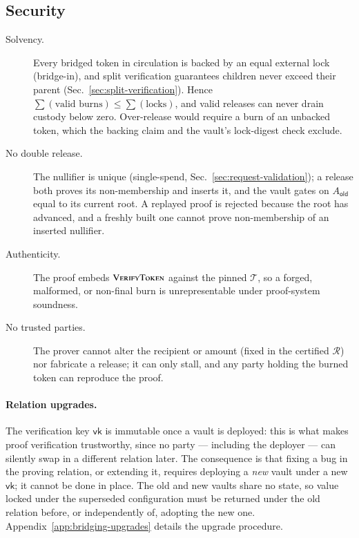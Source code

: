 \subsection{Security}\label{sec:bridge-security}

\begin{description}
\item[Solvency.] Every bridged token in circulation is backed by an equal external lock (bridge-in), and split verification guarantees children never exceed their parent (Sec.~\ref{sec:split-verification}). Hence $\sum(\text{valid burns}) \le \sum(\text{locks})$, and valid releases can never drain custody below zero. Over-release would require a burn of an unbacked token, which the backing claim and the vault's lock-digest check exclude.
\item[No double release.] The nullifier is unique (single-spend, Sec.~\ref{sec:request-validation}); a release both proves its non-membership and inserts it, and the vault gates on $A_\mathsf{old}$ equal to its current root. A replayed proof is rejected because the root has advanced, and a freshly built one cannot prove non-membership of an inserted nullifier.
\item[Authenticity.] The proof embeds $\Call{VerifyToken}{}$ against the pinned $\mathcal{T}$, so a forged, malformed, or non-final burn is unrepresentable under proof-system soundness.
\item[No trusted parties.] The prover cannot alter the recipient or amount (fixed in the certified $\mathcal{R}$) nor fabricate a release; it can only stall, and any party holding the burned token can reproduce the proof.
\end{description}

\paragraph{Relation upgrades.} The verification key $\mathsf{vk}$ is immutable once a vault is deployed: this is what makes proof verification trustworthy, since no party --- including the deployer --- can silently swap in a different relation later. The consequence is that fixing a bug in the proving relation, or extending it, requires deploying a \emph{new} vault under a new $\mathsf{vk}$; it cannot be done in place. The old and new vaults share no state, so value locked under the superseded configuration must be returned under the old relation before, or independently of, adopting the new one. Appendix~\ref{app:bridging-upgrades} details the upgrade procedure.

